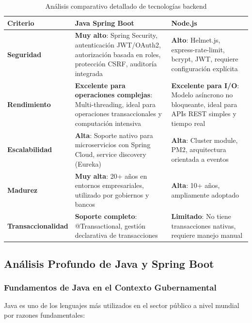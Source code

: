 \begin{table}[htbp]
\centering
\caption{Análisis comparativo detallado de tecnologías backend}
\label{tab:comparativa-backend}
\small
\begin{tabular}{|p{2.5cm}|p{4cm}|p{4cm}|}
\hline
\textbf{Criterio} & \textbf{Java Spring Boot} & \textbf{Node.js} \\
\hline
\textbf{Seguridad} & \textbf{Muy alto}: Spring Security, autenticación JWT/OAuth2, autorización basada en roles, protección CSRF, auditoría integrada & \textbf{Alto}: Helmet.js, express-rate-limit, bcrypt, JWT, requiere configuración explícita \\
\hline
\textbf{Rendimiento} & \textbf{Excelente para operaciones complejas}: Multi-threading, ideal para operaciones transaccionales y computación intensiva & \textbf{Excelente para I/O}: Modelo asíncrono no bloqueante, ideal para APIs REST simples y tiempo real \\
\hline
\textbf{Escalabilidad} & \textbf{Alta}: Soporte nativo para microservicios con Spring Cloud, service discovery (Eureka) & \textbf{Alta}: Cluster module, PM2, arquitectura orientada a eventos \\
\hline
\textbf{Madurez} & \textbf{Muy alta}: 20+ años en entornos empresariales, utilizado por gobiernos y bancos & \textbf{Alta}: 10+ años, ampliamente adoptado \\
\hline
\textbf{Transaccionalidad} & \textbf{Soporte completo}: @Transactional, gestión declarativa de transacciones & \textbf{Limitado}: No tiene transacciones nativas, requiere manejo manual \\
\hline
\end{tabular}
\end{table}

\subsection{Análisis Profundo de Java y Spring Boot}

\subsubsection{Fundamentos de Java en el Contexto Gubernamental}

Java es uno de los lenguajes más utilizados en el sector público a nivel mundial por razones fundamentales:

